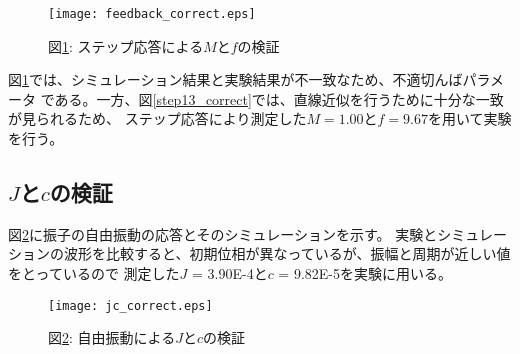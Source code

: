 \begin{figure}[htbp]
    \begin{center}
        \texttt{[image: feedback\_correct.eps]}
        \caption{図\ref{feedback_correct}: ステップ応答による$M$と$f$の検証}
        \label{feedback_correct}
    \end{center}
\end{figure}

図\ref{feedback_correct}では、シミュレーション結果と実験結果が不一致なため、不適切んばパラメータ
である。一方、図\ref{step13_correct}では、直線近似を行うために十分な一致が見られるため、
ステップ応答により測定した$M = 1.00$と$f = 9.67$を用いて実験を行う。

\subsection{$J$と$c$の検証}
図\ref{jc_correct}に振子の自由振動の応答とそのシミュレーションを示す。
実験とシミュレーションの波形を比較すると、初期位相が異なっているが、振幅と周期が近しい値をとっているので
測定した$J$ = 3.90E-4と$c$ = 9.82E-5を実験に用いる。

\begin{figure}[htbp]
    \begin{center}
        \texttt{[image: jc\_correct.eps]}
        \caption{図\ref{jc_correct}: 自由振動による$J$と$c$の検証}
        \label{jc_correct}
    \end{center}
\end{figure}




